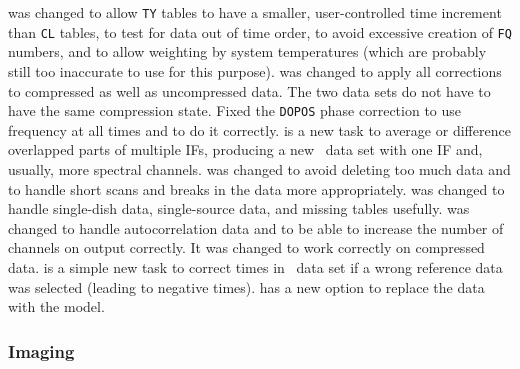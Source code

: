 \begin{description}
 was changed to allow {\tt TY} tables to have a smaller,
   user-controlled time increment than {\tt CL} tables, to test for
   data out of time order, to avoid excessive creation of {\tt FQ}
   numbers, and to allow weighting by system temperatures (which are
   probably still too inaccurate to use for this purpose).
 was changed to apply all corrections to compressed as
   well as uncompressed data.  The two data sets do not have to have
   the same compression state.  Fixed the {\tt DOPOS} phase correction
   to use frequency at all times and to do it correctly.
 is a new task to average or difference overlapped parts
   of multiple IFs, producing a new \uv\ data set with one IF and,
   usually, more spectral channels.
 was changed to avoid deleting too much data and to
   handle short scans and breaks in the data more appropriately.
 was changed to handle single-dish data, single-source
   data, and missing tables usefully.
 was changed to handle autocorrelation data and to be
   able to increase the number of channels on output correctly.  It
   was changed to work correctly on compressed data.
 is a simple new task to correct times in \uv\ data set
   if a wrong reference data was selected (leading to negative
   times).
 has a new option to replace the data with the model.
\end{description}

\subsubsection{Imaging}

